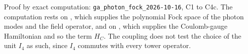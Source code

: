 Proof by exact computation: \texttt{ga\_photon\_fock\_2026-10-16}, C1 to C4c. The computation rests on , which supplies the polynomial Fock space of the photon modes and the field operator, and on , which supplies the Coulomb-gauge Hamiltonian and so the term $H_C$. The coupling does not test the choice of the unit $I_4$ as such, since $I_4$ commutes with every tower operator.

